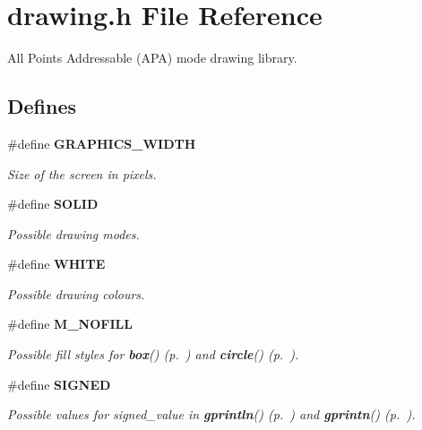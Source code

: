\section{drawing.h File Reference}
\label{drawing.h}
All Points Addressable (APA) mode drawing library. 


\subsection*{Defines}
\begin{CompactItemize}
\item 
\label{drawing.h_a0}
\#define {\bf GRAPHICS\_\-WIDTH}
\begin{CompactList}\small\item\em Size of the screen in pixels.\item\end{CompactList}

\item 
\label{drawing.h_a2}
\#define {\bf SOLID}
\begin{CompactList}\small\item\em Possible drawing modes.\item\end{CompactList}

\item 
\label{drawing.h_a6}
\#define {\bf WHITE}
\begin{CompactList}\small\item\em Possible drawing colours.\item\end{CompactList}

\item 
\label{drawing.h_a10}
\#define {\bf M\_\-NOFILL}
\begin{CompactList}\small\item\em Possible fill styles for {\bf box}() {\rm (p.~\pageref{drawing.h_a23})} and {\bf circle}() {\rm (p.~\pageref{drawing.h_a24})}.\item\end{CompactList}

\item 
\label{drawing.h_a12}
\#define {\bf SIGNED}
\begin{CompactList}\small\item\em Possible values for signed\_\-value in {\bf gprintln}() {\rm (p.~\pageref{drawing.h_a15})} and {\bf gprintn}() {\rm (p.~\pageref{drawing.h_a16})}.\item\end{CompactList}

\end{CompactItemize}
